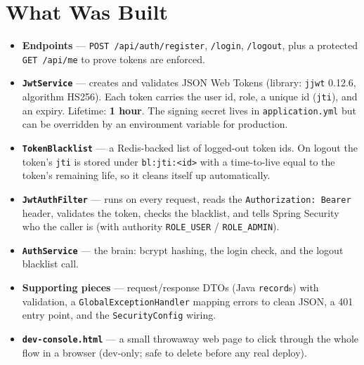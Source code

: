 \documentclass[11pt,a4paper]{article}
\newcommand{\code}[1]{\texttt{#1}}
\begin{document}
\section{What Was Built}
\begin{itemize}[leftmargin=*]
  \item \textbf{Endpoints} --- \code{POST /api/auth/register}, \code{/login}, \code{/logout}, plus a
        protected \code{GET /api/me} to prove tokens are enforced.
  \item \textbf{\code{JwtService}} --- creates and validates JSON Web Tokens (library: \code{jjwt}
        0.12.6, algorithm HS256). Each token carries the user id, role, a unique id (\code{jti}), and
        an expiry. Lifetime: \textbf{1 hour}. The signing secret lives in \code{application.yml} but
        can be overridden by an environment variable for production.
  \item \textbf{\code{TokenBlacklist}} --- a Redis-backed list of logged-out token ids. On logout the
        token's \code{jti} is stored under \code{bl:jti:<id>} with a time-to-live equal to the
        token's remaining life, so it cleans itself up automatically.
  \item \textbf{\code{JwtAuthFilter}} --- runs on every request, reads the \code{Authorization:
        Bearer} header, validates the token, checks the blacklist, and tells Spring Security who the
        caller is (with authority \code{ROLE\_USER} / \code{ROLE\_ADMIN}).
  \item \textbf{\code{AuthService}} --- the brain: bcrypt hashing, the login check, and the logout
        blacklist call.
  \item \textbf{Supporting pieces} --- request/response DTOs (Java \code{record}s) with validation,
        a \code{GlobalExceptionHandler} mapping errors to clean JSON, a 401 entry point, and the
        \code{SecurityConfig} wiring.
  \item \textbf{\code{dev-console.html}} --- a small throwaway web page to click through the whole
        flow in a browser (dev-only; safe to delete before any real deploy).
\end{itemize}

\end{document}
